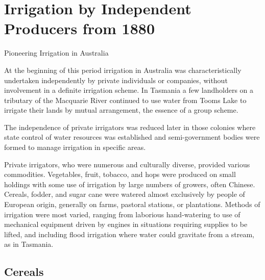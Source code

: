 
\setcounter{endnote}{0}
 
\chapter{Irrigation by Independent Producers from 1880}
\label{ch:indep}
%
{Pioneering Irrigation in Australia}

At the beginning of this period irrigation in Australia was
characteristically undertaken independently by private individuals or
companies, without involvement in a definite irrigation scheme.  In
Tasmania a few landholders on a tributary of the Macquarie River
continued to use water from Tooms Lake to irrigate their lands by
mutual arrangement, the essence of a group scheme.

The independence of private irrigators was reduced later in those
colonies where state control of water resources was established and
semi-government bodies were formed to manage irrigation in specific
areas.

Private irrigators, who were numerous and culturally diverse, provided
various commodities.  Vegetables, fruit, tobacco, and hops were
produced on small holdings with some use of irrigation by large
numbers of growers, often Chinese.  Cereals, fodder, and sugar cane
were watered almost exclusively by people of European origin,
generally on farms, pastoral stations, or plantations.  Methods of
irrigation were most varied, ranging from laborious hand-watering to
use of mechanical equipment driven by engines in situations requiring
supplies to be lifted, and including flood irrigation where water
could gravitate from a stream, as in Tasmania.

\section*{Cereals}

